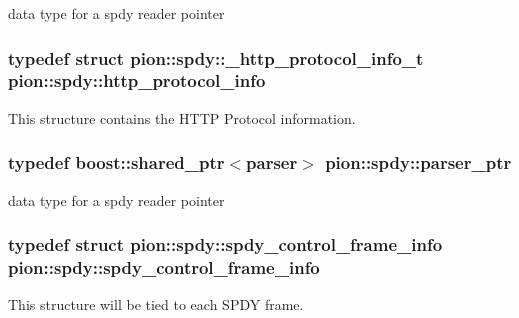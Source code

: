 data type for a spdy reader pointer 

\hypertarget{namespacepion_1_1spdy_a5263e12cb89d30893e41f7b595cae89a}{
\subsubsection[{http\-\_\-protocol\-\_\-info}]{\setlength{\rightskip}{0pt plus 5cm}typedef struct {\bf pion\-::spdy\-::\-\_\-http\-\_\-protocol\-\_\-info\-\_\-t}  {\bf pion\-::spdy\-::http\-\_\-protocol\-\_\-info}}}\label{namespacepion_1_1spdy_a5263e12cb89d30893e41f7b595cae89a}


This structure contains the H\-T\-T\-P Protocol information. 

\hypertarget{namespacepion_1_1spdy_aa2cb51d7f3735315fbac9c5823b6b5da}{
\subsubsection[{parser\-\_\-ptr}]{\setlength{\rightskip}{0pt plus 5cm}typedef boost\-::shared\-\_\-ptr$<${\bf parser}$>$ {\bf pion\-::spdy\-::parser\-\_\-ptr}}}\label{namespacepion_1_1spdy_aa2cb51d7f3735315fbac9c5823b6b5da}


data type for a spdy reader pointer 

\hypertarget{namespacepion_1_1spdy_af27b192d1db7a013f86914a93c5e1904}{
\subsubsection[{spdy\-\_\-control\-\_\-frame\-\_\-info}]{\setlength{\rightskip}{0pt plus 5cm}typedef struct {\bf pion\-::spdy\-::spdy\-\_\-control\-\_\-frame\-\_\-info}  {\bf pion\-::spdy\-::spdy\-\_\-control\-\_\-frame\-\_\-info}}}\label{namespacepion_1_1spdy_af27b192d1db7a013f86914a93c5e1904}


This structure will be tied to each S\-P\-D\-Y frame. 

